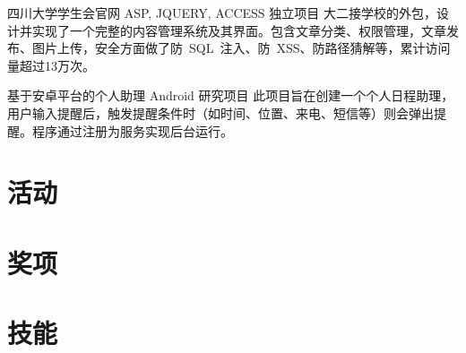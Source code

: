 \documentclass[11pt,a4paper]{moderncv}
\begin{document}
{四川大学学生会官网}
{ASP, JQUERY, ACCESS}
{独立项目}{}
{大二接学校的外包，设计并实现了一个完整的内容管理系统及其界面。包含文章分类、权限管理，文章发布、图片上传，安全方面做了防~SQL~注入、防~XSS、防路径猜解等，累计访问量超过13万次。}
\vspace*{0.8\baselineskip}

{基于安卓平台的个人助理}
{Android}
{研究项目}{}
{此项目旨在创建一个个人日程助理，用户输入提醒后，触发提醒条件时（如时间、位置、来电、短信等）则会弹出提醒。程序通过注册为服务实现后台运行。}
\renewcommand{\baselinestretch}{1.0}

\section{活动}

\section{奖项}

\section{技能}

\closesection{}                   %
\renewcommand{\listitemsymbol}{-} %
\end{document}
